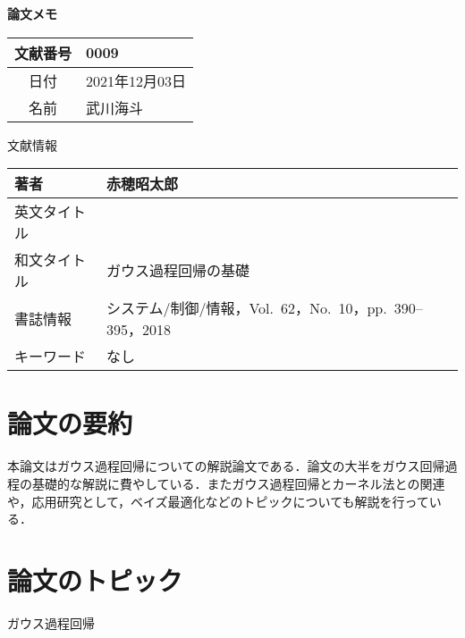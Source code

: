 \documentclass[10pt,onecolumn]{jsarticle}
\begin{document}
\vspace{-20mm}
\begin{center}
{\LARGE\textbf{論文メモ}}
\end{center}

\begin{flushright}
\begin{tabular}{|c|l|}
\hline
文献番号  &  0009
\\
\hline
日付  &  2021年12月03日
\\
\hline
名前  &  武川海斗
\\
\hline
\end{tabular}
\end{flushright}


%
%
\begin{center}
{\large 文献情報}
\begin{table}[hbp]%
\begin{tabular}{|l||l|}
\hline
著者  &  赤穂昭太郎
\\ \hline
英文タイトル  &
\\ \hline
和文タイトル  & ガウス過程回帰の基礎
\\ \hline
書誌情報  &  システム/制御/情報，Vol.~62，No.~10，pp.~390--395，2018
\\ \hline
キーワード & なし
\\ \hline
\end{tabular}
\end{table}
\end{center}


\section{論文の要約}
本論文はガウス過程回帰についての解説論文である．論文の大半をガウス回帰過程の基礎的な解説に費やしている．またガウス過程回帰とカーネル法との関連や，応用研究として，ベイズ最適化などのトピックについても解説を行っている．
\section{論文のトピック}
ガウス過程回帰
\end{document}
